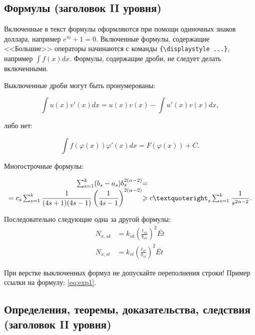 \documentclass{math-mech-sci}
\begin{document}
\subsection*{Формулы (заголовок II уровня)}

Включенные в текст формулы оформляются при помощи одиночных знаков доллара, например $e^{\pi i} + 1 = 0$.
Включенные формулы, содержащие <<Большие>> операторы начинаются с команды \verb"{\displaystyle ...}", например ${\displaystyle\int f(x)dx}$. Формулы, содержащие дроби, не следует делать включенными.

Выключенные дроби могут быть пронумерованы:

\begin{equation}
	\label{eq:exp1}
	\int u(x)v'(x)dx=u(x)v(x)-\int u'(x)v(x)dx,
\end{equation}

либо нет:

\begin{equation*}
	\int f(\varphi(x))\varphi'(x)dx=F(\varphi(x))+C.
\end{equation*}

Многострочные формулы:

\begin{equation}\label{eq:exp2}
\begin{array}{r@{}l}
	\sum^{k}_{s=1}(b_s-a_s)b^{2(\alpha-2)}_s  &= \\
	=c_s\sum^{k}_{s=1}\displaystyle\frac{1}{(4s+1)(4s-1)}\left(\displaystyle\frac{1}{4s-1}\right)^{2(\alpha-2)}
	&\geqslant c’_s\sum^{k}_{s=1}\displaystyle\frac{1}{s^{2\alpha-2}}.
\end{array}
\end{equation}

Последовательно следующие одна за другой формулы:
\begin{align}
	N_{x,sk} &= k_{sk}\left(\frac{t_{sk}}{b_{sk}}\right)^{2}\bar{Et}\\
	N_{x,st} &= k_{st}\left(\frac{t_{st}}{b_{st}}\right)^{2}\bar{Et}
\end{align}

При верстке выключенных формул не допускайте переполнения строки! Пример ссылки на формулу: \eqref{eq:exp1}.

\subsection*{Определения, теоремы, доказательства, следствия (заголовок II уровня)}
\end{document}
